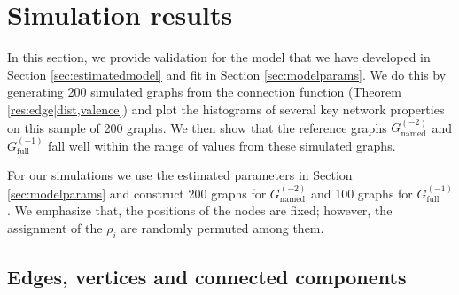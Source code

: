 \documentclass[11]{article}
\newcommand{\namedtwo}{G_{\textrm{named}}^{(-2)}}
\newcommand{\fullone}{G_{\textrm{full}}^{(-1)}}
\theoremstyle{remark}
\theoremstyle{definition}
\begin{document}





\section{Simulation results\label{sec:simulation}}

In this section, we provide validation for the model that we have developed in Section \ref{sec:estimatedmodel} and fit in Section \ref{sec:modelparams}. We do this by generating 200 simulated graphs from the connection function (Theorem \ref{res:edge|dist,valence}) and plot the histograms of several key network properties on this sample of 200 graphs. We then show that the reference graphs $\namedtwo$ and $\fullone$ fall well within the range of values from these simulated graphs.

For our simulations we use the estimated parameters in Section \ref{sec:modelparams} and construct 200 graphs for $\namedtwo$ and 100 graphs for $\fullone$. We emphasize that, the positions of the nodes are fixed; however, the assignment of the $\rho_i$ are randomly permuted among them.


\subsection{Edges, vertices and connected components\label{sec:edgesetc.}}
\end{document}
